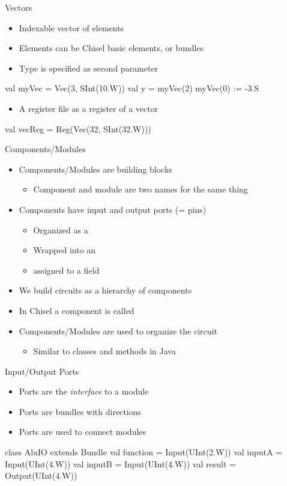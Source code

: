 \begin{frame}[fragile]{Vectors}
\begin{itemize}
\item Indexable vector of elements
\item Elements can be Chisel basic elements, or bundles
\item Type is specified as second parameter
\end{itemize}
\begin{chisel}
val myVec = Vec(3, SInt(10.W))
val y = myVec(2)
myVec(0) := -3.S
\end{chisel}
\begin{itemize}
\item A register file as a register of a vector
\end{itemize}
\begin{chisel}
val vecReg = Reg(Vec(32, SInt(32.W)))
\end{chisel}
\end{frame}

\begin{frame}[fragile]{Components/Modules}
\begin{itemize}
\item Components/Modules are building blocks
\begin{itemize}
\item Component and module are two names for the same thing
\end{itemize}
\item Components have input and output ports (= pins)
\begin{itemize}
\item Organized as a 
\item Wrapped into an 
\item assigned to a field 
\end{itemize}
\item We build circuits as a hierarchy of components
\item In Chisel a component is called 
\item Components/Modules are used to organize the circuit
\begin{itemize}
\item Similar to classes and methods in Java
\end{itemize}
\end{itemize}
\end{frame}


\begin{frame}[fragile]{Input/Output Ports}
\begin{itemize}
\item Ports are the \emph{interface} to a module
\item Ports are bundles with directions
\item Ports are used to connect modules
\end{itemize}
\begin{chisel}
class AluIO extends Bundle {
  val function = Input(UInt(2.W))
  val inputA = Input(UInt(4.W))
  val inputB = Input(UInt(4.W))
  val result = Output(UInt(4.W))
}
\end{chisel}
\end{frame}


